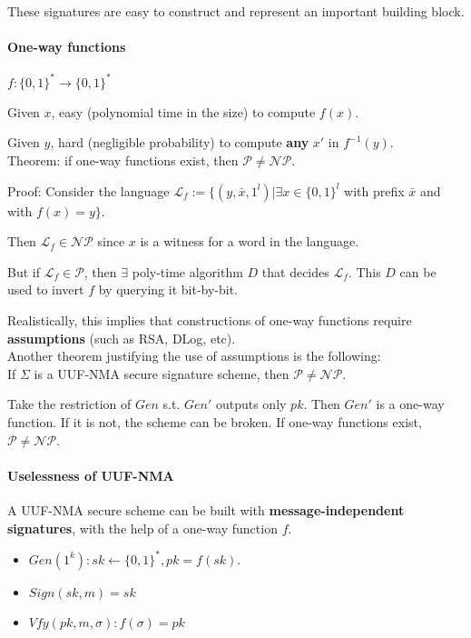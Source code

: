 \documentclass[oneside]{book}
\begin{document}
These signatures are easy to construct and represent an important building block.

\paragraph{One-way functions}
$f: \{0,1\}^* \rightarrow \{0,1\}^*$

Given $x$, easy (polynomial time in the size) to compute $f(x)$.

Given $y$, hard (negligible probability) to compute \textbf{any} $x'$ in $f^{-1}(y)$.\\

Theorem: if one-way functions exist, then $\mathcal{P} \ne \mathcal{NP}$.

Proof: Consider the language $\mathcal{L}_f := \{(y, \bar{x}, 1^l) | \exists x \in \{0,1\}^l$ with prefix $\bar{x}$ and with $f(x) = y\}$.

Then $\mathcal{L}_f \in \mathcal{NP}$ since $x$ is a witness for a word in the language.

But if $\mathcal{L}_f \in \mathcal{P}$, then $\exists$ poly-time algorithm $D$ that decides $\mathcal{L}_f$. This $D$ can be used to invert $f$ by querying it bit-by-bit.

Realistically, this implies that constructions of one-way functions require \textbf{assumptions} (such as RSA, DLog, etc).\\

Another theorem justifying the use of assumptions is the following:\\
If $\Sigma$ is a UUF-NMA secure signature scheme, then $\mathcal{P} \ne \mathcal{NP}$.

Take the restriction of $Gen$ s.t. $Gen'$ outputs only $pk$. Then $Gen'$ is a one-way function. If it is not, the scheme can be broken. If one-way functions exist, $\mathcal{P} \ne \mathcal{NP}$.

\paragraph{Uselessness of UUF-NMA}
A UUF-NMA secure scheme can be built with \textbf{message-independent signatures}, with the help of a one-way function $f$.
\begin{itemize}
    \item $Gen(1^k): sk \leftarrow \{0,1\}^*, pk = f(sk)$.
    \item $Sign(sk, m) = sk$
    \item $Vfy(pk, m, \sigma): f(\sigma) = pk$
\end{itemize}
\end{document}

